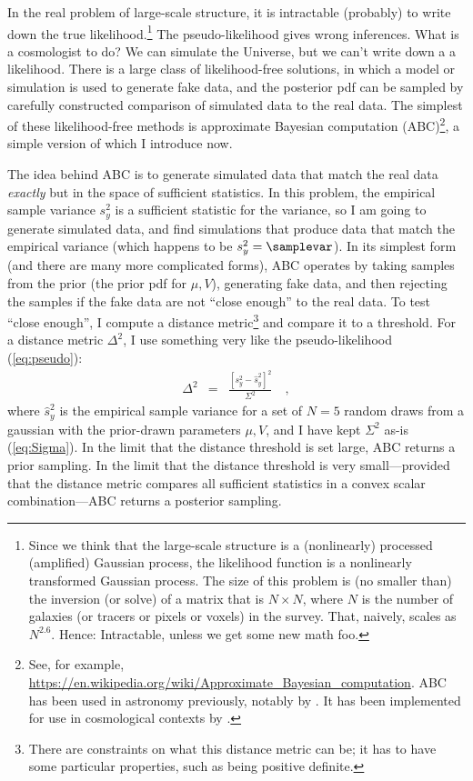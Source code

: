 \documentclass[12pt, letterpaper, preprint]{aastex}
\begin{document}
In the real problem of large-scale structure, it is intractable
(probably) to write down the true likelihood.\footnote{Since we think
  that the large-scale structure is a (nonlinearly) processed
  (amplified) Gaussian process, the likelihood function is a
  nonlinearly transformed Gaussian process. The size of this problem
  is (no smaller than) the inversion (or solve) of a matrix that is
  $N\times N$, where $N$ is the number of galaxies (or tracers or
  pixels or voxels) in the survey. That, naively, scales as
  $N^{2.6}$. Hence: Intractable, unless we get some new math foo.}
The pseudo-likelihood gives wrong inferences.
What is a cosmologist to do?
We can simulate the Universe, but we can't write down a a likelihood.
There is a large class of likelihood-free solutions, in which a model
or simulation is used to generate fake data, and the posterior pdf can
be sampled by carefully constructed comparison of simulated data to
the real data.
The simplest of these likelihood-free methods is approximate Bayesian
computation (ABC)\footnote{See, for example, \url{https://en.wikipedia.org/wiki/Approximate_Bayesian_computation}.
  ABC has been used in astronomy previously,
  notably by \cite{cameron}.
  It has been implemented for use in cosmological contexts by
  \cite{ishida}.}, a simple version of which I introduce now.

The idea behind ABC is to generate simulated data that match the
real data \emph{exactly} but in the space of sufficient statistics.
In this problem, the empirical sample variance $s^2_y$ is a sufficient
statistic for the variance, so I am going to generate simulated
data, and find simulations that produce data that match the empirical
variance (which happens to be $s^2_y = \samplevar$).
In its simplest form (and there are many more complicated forms), ABC
operates by taking samples from the prior (the prior pdf for $\mu,
V$), generating fake data, and then rejecting the samples if the fake
data are not ``close enough'' to the real data.
To test ``close enough'', I compute a distance metric\footnote{There
  are constraints on what this distance metric can be; it has to have
  some particular properties, such as being positive definite.} and compare it to a threshold.
For a distance metric $\Delta^2$, I use something very like the
pseudo-likelihood (\ref{eq:pseudo}):
\begin{eqnarray}
\Delta^2 &=& \frac{[s^2_y - \hat{s}^2_y]^2}{\Sigma^2}
\label{eq:dist}\quad ,
\end{eqnarray}
where $\hat{s}^2_y$ is the empirical sample variance for a set
of $N=5$ random draws from a gaussian with the prior-drawn parameters
$\mu, V$, and I have kept $\Sigma^2$ as-is (\ref{eq:Sigma}).
In the limit that the distance threshold is set large, ABC returns a prior
sampling.
In the limit that the distance threshold is very small---provided that
the distance metric compares all sufficient statistics in a convex
scalar combination---ABC returns a posterior sampling.
\end{document}
